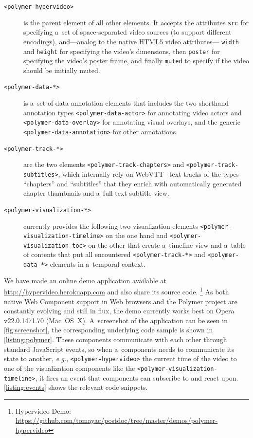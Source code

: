 \documentclass[runningheads,a4paper]{llncs}
\begin{document}
\begin{description}
  \item[\texttt{<polymer-hypervideo>}] is the parent element of all other elements.
    It accepts the attributes \texttt{src} for specifying a~set of
    space-separated video sources (to support different encodings),
    and---analog to the native HTML5 video attributes---%
    \texttt{width} and \texttt{height} for specifying the video's dimensions,
    then \texttt{poster} for specifying the video's poster frame, and finally \texttt{muted} to specify if the video should be initially muted.
  \item[\texttt{<polymer-data-*>}] is a~set of data annotation elements
    that includes the two shorthand annotation types
    \texttt{<polymer-data-actor>} for annotating video actors and
    \texttt{<polymer-data-overlay>} for annotating visual overlays,
    and the generic \texttt{<polymer-data-annotation>} for other annotations.
  \item[\texttt{<polymer-track-*>}] are the two elements
    \texttt{<polymer-track-chapters>} and \texttt{<polymer-track-subtitles>},
    which internally rely on WebVTT~\cite{pfeiffer2013webvtt} text tracks
    of the types ``chapters'' and ``subtitles'' that they enrich with
    automatically generated chapter thumbnails and a~full text subtitle view.
  \item[\texttt{<polymer-visualization-*>}] currently provides the
    following two visualization elements
    \texttt{<polymer-visualization-timeline>} on the one hand and 
    \texttt{<polymer-visualization-toc>} on the other
    that create a~timeline view and a~table of contents
    that put all encountered \texttt{<polymer-track-*>}
    and \texttt{<polymer-data-*>} elements in a~temporal context.
\end{description}

\noindent We have made an online demo application available at
\url{http://hypervideo.herokuapp.com} and also share its source code.%
\footnote{Hypervideo Demo:
\url{https://github.com/tomayac/postdoc/tree/master/demos/polymer-hypervideo}}
As both native Web Component support in Web browsers and the Polymer project
are constantly evolving and still in flux, the demo currently works best on
Opera v22.0.1471.70	(Mac~OS~X).
A~screenshot of the application can be seen in \autoref{fig:screenshot},
the corresponding underlying code sample is shown in \autoref{listing:polymer}.
These components communicate with each other through standard JavaScript events,
so when a~components needs to communicate its state to another, \emph{e.g.},
\texttt{<polymer-hypervideo>} the current time of the video to one of the
visualization components like the \texttt{<polymer-visualization-timeline>},
it fires an event that components can subscribe to and react upon.
\autoref{listing:events} shows the relevant code snippets.
\end{document}
